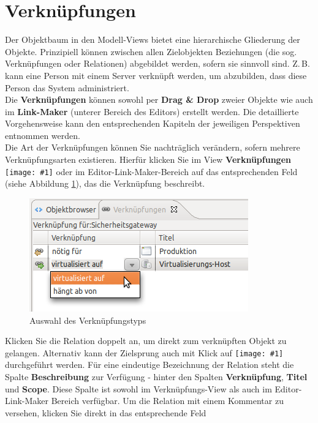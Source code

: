 \documentclass[a4paper,10pt]{book}
\newcommand{\icon}[1]{\texttt{[image: \#1]}}
\begin{document}
\section{Verknüpfungen}
Der Objektbaum in den Modell-Views bietet eine hierarchische Gliederung der
Objekte. Prinzipiell können zwischen allen Zielobjekten Beziehungen (die sog.
Verknüpfungen oder Relationen) abgebildet werden, sofern sie sinnvoll sind.
Z.\,B. kann eine Person mit einem Server verknüpft werden, um abzubilden, dass
diese Person das System administriert.
\newline\\
Die \textbf{Verknüpfungen} können sowohl per \textbf{Drag \& Drop}
zweier Objekte wie auch im \textbf{Link-Maker} (unterer Bereich des
Editors) erstellt werden.  Die detaillierte Vorgehensweise kann den
entsprechenden Kapiteln der jeweiligen Perspektiven entnommen werden.
\newline\\
Die Art der Verknüpfungen können Sie nachträglich verändern, sofern
mehrere Verknüpfungsarten existieren. Hierfür klicken Sie im View
\textbf{Verknüpfungen} \icon{Icon/Relationen.png}
oder im Editor-Link-Maker-Bereich auf das entsprechenden Feld (siehe
Abbildung \ref{Auswahl des Verknuepfungstyps}), das die Verknüpfung
beschreibt.  \newline
\begin{figure}[htb!]
  \centering
  \includegraphics[scale=.7]{Screenshot/Verknue.png}
  \caption{\label{Auswahl des Verknuepfungstyps} Auswahl des Verknüpfungstyps}
\end{figure}
\newline
Klicken Sie die Relation doppelt an, um direkt zum verknüpften Objekt zu gelangen. Alternativ kann der Zielsprung auch mit
Klick auf \icon{Icon/Ziel.png} durchgeführt werden. Für eine eindeutige Bezeichnung der Relation steht die Spalte
\textbf{Beschreibung} zur Verfügung - hinter den Spalten \textbf{Verknüpfung}, \textbf{Titel} und \textbf{Scope}. Diese Spalte ist sowohl im Verknüpfungs-View
als auch im Editor-Link-Maker Bereich verfügbar. Um die Relation mit einem Kommentar zu versehen, klicken Sie direkt in das entsprechende Feld
\end{document}
